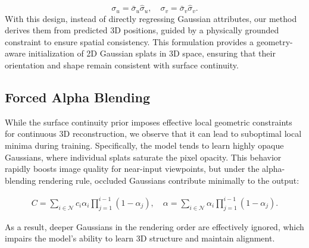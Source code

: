 \begin{equation}
\sigma_u = \bar{\sigma}_u \hat{\sigma}_u, \quad \sigma_v = \bar{\sigma}_v \hat{\sigma}_v.
\end{equation}
With this design, instead of directly regressing Gaussian attributes,
our method derives them from predicted 3D positions, guided by a physically grounded constraint to ensure spatial consistency. This formulation provides a geometry-aware initialization of 2D Gaussian splats in 3D space, ensuring that their orientation and shape remain consistent with surface continuity. 




\subsection{Forced Alpha Blending}

While the surface continuity prior imposes effective local geometric constraints for continuous 3D reconstruction, we observe that it can lead to suboptimal local minima during training. Specifically, the model tends to learn highly opaque Gaussians, where individual splats saturate the pixel opacity. This behavior rapidly boosts image quality for near-input viewpoints, but under the alpha-blending rendering rule, occluded Gaussians contribute minimally to the output:

\begin{align}
    C = \sum_{i \in \mathcal{N}} c_i \alpha_i \prod_{j=1}^{i-1} (1 - \alpha_j), \quad 
    \alpha = \sum_{i \in \mathcal{N}} \alpha_i \prod_{j=1}^{i-1} (1 - \alpha_j).
\end{align}

As a result, deeper Gaussians in the rendering order are effectively ignored, which impairs the model’s ability to learn 3D structure and maintain alignment.

